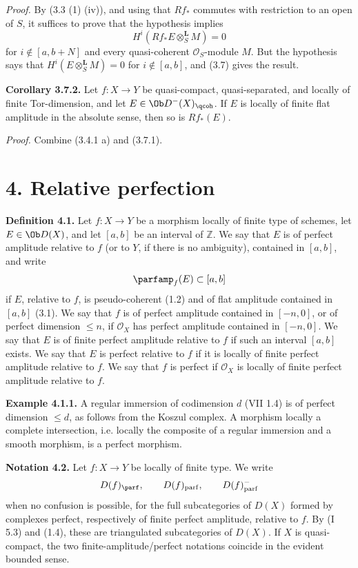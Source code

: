 \emph{Proof.} By (3.3 (1) (iv)), and using that \(Rf_*\) commutes with restriction to an open of \(S\), it suffices to prove that the hypothesis implies
\[
 H^i(Rf_*E\otimes_S^{\mathbf L}M)=0
\]
for \(i\notin[a,b+N]\) and every quasi-coherent \(\mathcal O_S\)-module \(M\). But the hypothesis says that \(H^i(E\otimes_S^{\mathbf L}M)=0\) for \(i\notin[a,b]\), and (3.7) gives the result.

\textbf{Corollary 3.7.2.} Let \(f:X\to Y\) be quasi-compact, quasi-separated, and locally of finite Tor-dimension, and let \(E\in\Ob D^{-}(X)_{\qcoh}\). If \(E\) is locally of finite flat amplitude in the absolute sense, then so is \(Rf_*(E)\).

\emph{Proof.} Combine (3.4.1 a) and (3.7.1).

\section*{4. Relative perfection}

\textbf{Definition 4.1.} Let \(f:X\to Y\) be a morphism locally of finite type of schemes, let \(E\in\Ob D(X)\), and let \([a,b]\) be an interval of \(\mathbb Z\). We say that \(E\) is of perfect amplitude relative to \(f\) (or to \(Y\), if there is no ambiguity), contained in \([a,b]\), and write
\[
 \parfamp_f(E)\subset[a,b]
\]
if \(E\), relative to \(f\), is pseudo-coherent (1.2) and of flat amplitude contained in \([a,b]\) (3.1). We say that \(f\) is of perfect amplitude contained in \([-n,0]\), or of perfect dimension \(\leq n\), if \(\mathcal O_X\) has perfect amplitude contained in \([-n,0]\). We say that \(E\) is of finite perfect amplitude relative to \(f\) if such an interval \([a,b]\) exists. We say that \(E\) is perfect relative to \(f\) if it is locally of finite perfect amplitude relative to \(f\). We say that \(f\) is perfect if \(\mathcal O_X\) is locally of finite perfect amplitude relative to \(f\).

\textbf{Example 4.1.1.} A regular immersion of codimension \(d\) (VII 1.4) is of perfect dimension \(\leq d\), as follows from the Koszul complex. A morphism locally a complete intersection, i.e. locally the composite of a regular immersion and a smooth morphism, is a perfect morphism.

\textbf{Notation 4.2.} Let \(f:X\to Y\) be locally of finite type. We write
\[
 D(f)_{\parf},\qquad D(f)_{\mathrm{parf}},\qquad D(f)_{\mathrm{parf}}^{-}
\]
when no confusion is possible, for the full subcategories of \(D(X)\) formed by complexes perfect, respectively of finite perfect amplitude, relative to \(f\). By (I 5.3) and (1.4), these are triangulated subcategories of \(D(X)\). If \(X\) is quasi-compact, the two finite-amplitude/perfect notations coincide in the evident bounded sense.

